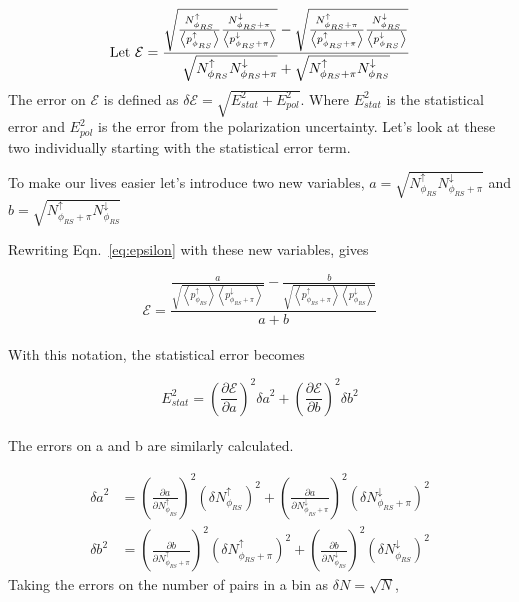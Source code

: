 \documentclass[letterpaper, abstract = on,listof=totoc, bibliography=totoc]{scrreprt}
\newcommand{\phirs}{\phi_{RS}}
\begin{document}
\begin{equation}
\label{eq:epsilon}
\textnormal{Let } \mathcal{E} = \frac{\sqrt{\frac{N^\uparrow_{\phi_{RS}}}{\left<p^\uparrow_{\phirs}\right>} \frac{N^\downarrow_{\phi_{RS}+\pi}}{\left<p^\downarrow_{\phirs+\pi}\right>}} - \sqrt{\frac{N^\uparrow_{\phi_{RS}+\pi}}{\left<p^\uparrow_{\phirs+\pi}\right>} \frac{N^\downarrow_{\phi_{RS}}}{\left<p^\downarrow_{\phirs}\right>}}}       {\sqrt{N^\uparrow_{\phi_{RS}} N^\downarrow_{\phi_{RS}+\pi}} + \sqrt{N^\uparrow_{\phi_{RS}+\pi} N^\downarrow_{\phi_{RS}}}}
\end{equation}
The error on $\mathcal{E}$ is defined as $\delta \mathcal{E} = \sqrt{E^2_{stat} + E^2_{pol}}$. Where $E^2_{stat}$ is the statistical error and $E^2_{pol}$ is the error from the polarization uncertainty. Let's look at these two individually starting with the statistical error term.

To make our lives easier let's introduce two new variables, $a = \sqrt{N^\uparrow_{\phi_{RS}}N^\downarrow_{\phi_{RS}+\pi}}$ and $b = \sqrt{N^\uparrow_{\phi_{RS}+\pi}N^\downarrow_{\phi_{RS}}}$

Rewriting Eqn.~\ref{eq:epsilon} with these new variables, gives

\begin{equation}
\label{eq:epsilonAB}
\mathcal{E} = \frac{\frac{a}{\sqrt{\left<p^\uparrow_{\phirs}\right>\left<p^\downarrow_{\phirs+\pi}\right>}}  - \frac{b}{\sqrt{\left<p^\uparrow_{\phirs+\pi}\right>\left<p^\downarrow_{\phirs}\right>}}} {a+b}
\end{equation}\\
%
With this notation, the statistical error becomes

\begin{equation}
\label{eq:Estat}
E_{stat}^2 = \left(\frac{\partial \mathcal{E}}{\partial a}\right)^2 {\delta a}^2 + \left(\frac{\partial \mathcal{E}}{\partial b}\right)^2 {\delta b}^2
\end{equation}\\
%
The errors on a and b are similarly calculated. 


\begin{align}
{\delta a}^2 &= \left(\frac{\partial a}{\partial N^\uparrow_{\phirs}}\right)^2 \left(\delta N^\uparrow_{\phirs}\right)^2 + \left(\frac{\partial a}{\partial N^\downarrow_{\phirs+\pi}}\right)^2 \left(\delta N^\downarrow_{\phirs+\pi}\right)^2 \\
{\delta b}^2 &= \left(\frac{\partial b}{\partial N^\uparrow_{\phirs+\pi}}\right)^2 \left(\delta N^\uparrow_{\phirs+\pi}\right)^2 + \left(\frac{\partial b}{\partial N^\downarrow_{\phirs}}\right)^2 \left(\delta N^\downarrow_{\phirs}\right)^2 
\end{align}
%
Taking the errors on the number of pairs in a bin as $\delta N = \sqrt{N}$,
\end{document}
